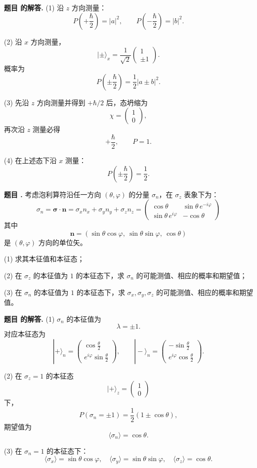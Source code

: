 \documentclass[12pt, a4paper, oneside]{ctexart}
\newcounter{problemname}
\newenvironment{problem}
  {\begin{shaded}\stepcounter{problemname}\par\noindent\textbf{题目 \theproblemname. }}
  {\end{shaded}\par}
\newenvironment{solution}
  {\par\noindent\textbf{题目 \theproblemname 的解答. }}
  {\par}
\begin{document}
\begin{solution}
  (1) 沿 $z$ 方向测量：
\[
P\left(+\frac{\hbar}{2}\right)=|a|^2,\qquad
P\left(-\frac{\hbar}{2}\right)=|b|^2.
\]

(2) 沿 $x$ 方向测量，
\[
|\pm\rangle_x=\frac{1}{\sqrt2}
\begin{pmatrix}1\\ \pm1\end{pmatrix}.
\]
概率为
\[
P\left(\pm\frac{\hbar}{2}\right)
=\frac12|a\pm b|^2.
\]

(3) 先沿 $z$ 方向测量并得到 $+\hbar/2$ 后，态坍缩为
\[
\chi=\begin{pmatrix}1\\0\end{pmatrix},
\]
再次沿 $z$ 测量必得
\[
+\frac{\hbar}{2},\qquad P=1.
\]

(4) 在上述态下沿 $x$ 测量：
\[
P\left(\pm\frac{\hbar}{2}\right)=\frac12.
\]
\end{solution}

\begin{problem}
  考虑泡利算符沿任一方向 $(\theta,\varphi)$ 的分量 $\sigma_n$，在 $\sigma_z$ 表象下为：
\[
\sigma_n=\boldsymbol{\sigma}\cdot\boldsymbol{n}
=\sigma_x n_x+\sigma_y n_y+\sigma_z n_z
=
\begin{pmatrix}
\cos\theta & \sin\theta\,e^{-i\varphi} \\
\sin\theta\,e^{i\varphi} & -\cos\theta
\end{pmatrix}
\]
其中
\[
\boldsymbol{n}=(\sin\theta\cos\varphi,\ \sin\theta\sin\varphi,\ \cos\theta)
\]
是 $(\theta,\varphi)$ 方向的单位矢。

(1) 求其本征值和本征态；

(2) 在 $\sigma_z$ 的本征值为 $1$ 的本征态下，求 $\sigma_n$ 的可能测值、相应的概率和期望值；

(3) 在 $\sigma_n$ 的本征值为 $1$ 的本征态下，求 $\sigma_x,\sigma_y,\sigma_z$ 的可能测值、相应的概率和期望值。
\end{problem}

\begin{solution}
  (1) $\sigma_n$ 的本征值为
\[
\lambda=\pm1.
\]
对应本征态为
\[
|+\rangle_n=
\begin{pmatrix}
\cos\frac{\theta}{2} \\
e^{i\varphi}\sin\frac{\theta}{2}
\end{pmatrix},
\qquad
|-\rangle_n=
\begin{pmatrix}
-\sin\frac{\theta}{2} \\
e^{i\varphi}\cos\frac{\theta}{2}
\end{pmatrix}.
\]

(2) 在 $\sigma_z=1$ 的本征态
\[
|+\rangle_z=\begin{pmatrix}1\\0\end{pmatrix}
\]
下，
\[
P(\sigma_n=\pm1)=\frac12(1\pm\cos\theta),
\]
期望值为
\[
\langle\sigma_n\rangle=\cos\theta.
\]

(3) 在 $\sigma_n=1$ 的本征态下：
\[
\langle\sigma_x\rangle=\sin\theta\cos\varphi,
\quad
\langle\sigma_y\rangle=\sin\theta\sin\varphi,
\quad
\langle\sigma_z\rangle=\cos\theta.
\]
\end{solution}
\end{document}

